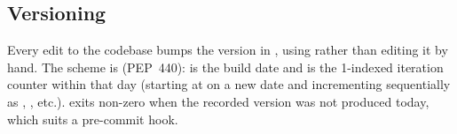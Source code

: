 \subsection{Versioning}

Every edit to the codebase bumps the version in
, using 
rather than editing it by hand. The scheme is  (PEP~440):
 is the build date and  is the 1-indexed iteration counter
within that day (starting at  on a new date and incrementing
sequentially as , , etc.).  exits non-zero when
the recorded version was not produced today, which suits a pre-commit hook.
